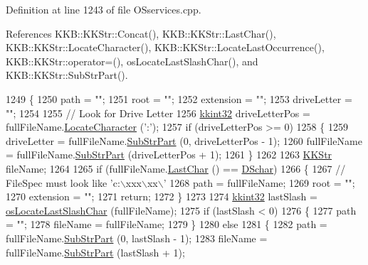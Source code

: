 Definition at line 1243 of file O\+Sservices.\+cpp.



References K\+K\+B\+::\+K\+K\+Str\+::\+Concat(), K\+K\+B\+::\+K\+K\+Str\+::\+Last\+Char(), K\+K\+B\+::\+K\+K\+Str\+::\+Locate\+Character(), K\+K\+B\+::\+K\+K\+Str\+::\+Locate\+Last\+Occurrence(), K\+K\+B\+::\+K\+K\+Str\+::operator=(), os\+Locate\+Last\+Slash\+Char(), and K\+K\+B\+::\+K\+K\+Str\+::\+Sub\+Str\+Part().


\begin{DoxyCode}
1249 \{
1250   path = \textcolor{stringliteral}{""};
1251   root = \textcolor{stringliteral}{""};
1252   extension = \textcolor{stringliteral}{""};
1253   driveLetter = \textcolor{stringliteral}{""};
1254 
1255   \textcolor{comment}{// Look for Drive Letter}
1256   \hyperlink{namespace_k_k_b_a8fa4952cc84fda1de4bec1fbdd8d5b1b}{kkint32}  driveLetterPos = fullFileName.\hyperlink{class_k_k_b_1_1_k_k_str_ad738b238e609887bbf27841f359046cd}{LocateCharacter} (\textcolor{charliteral}{':'});
1257   \textcolor{keywordflow}{if}  (driveLetterPos >= 0)
1258   \{
1259     driveLetter  = fullFileName.\hyperlink{class_k_k_b_1_1_k_k_str_a5f20b2ddfc9f07c8ef99592810332ddb}{SubStrPart} (0, driveLetterPos - 1);
1260     fullFileName = fullFileName.\hyperlink{class_k_k_b_1_1_k_k_str_a5f20b2ddfc9f07c8ef99592810332ddb}{SubStrPart} (driveLetterPos + 1);
1261   \}
1262 
1263   \hyperlink{class_k_k_b_1_1_k_k_str}{KKStr}  fileName;
1264 
1265   \textcolor{keywordflow}{if}  (fullFileName.\hyperlink{class_k_k_b_1_1_k_k_str_ad1951ace757c18c2d01df666b3a4032c}{LastChar} () == \hyperlink{_o_sservices_8h_a29059d292084a3fa6111cd5ea6cac1d9}{DSchar})
1266   \{
1267     \textcolor{comment}{// FileSpec must look like  'c:\(\backslash\)xxx\(\backslash\)xx\(\backslash\)'}
1268     path      = fullFileName;
1269     root      = \textcolor{stringliteral}{""};
1270     extension = \textcolor{stringliteral}{""};
1271     \textcolor{keywordflow}{return};
1272   \}
1273 
1274   \hyperlink{namespace_k_k_b_a8fa4952cc84fda1de4bec1fbdd8d5b1b}{kkint32}  lastSlash =  \hyperlink{namespace_k_k_b_ada3fe25ed5e0c30732f3cd6bd2a29edb}{osLocateLastSlashChar} (fullFileName);
1275   \textcolor{keywordflow}{if}  (lastSlash < 0)
1276   \{
1277     path = \textcolor{stringliteral}{""};
1278     fileName = fullFileName;
1279   \}
1280   \textcolor{keywordflow}{else} 
1281   \{
1282     path     = fullFileName.\hyperlink{class_k_k_b_1_1_k_k_str_a5f20b2ddfc9f07c8ef99592810332ddb}{SubStrPart} (0, lastSlash - 1);
1283     fileName = fullFileName.\hyperlink{class_k_k_b_1_1_k_k_str_a5f20b2ddfc9f07c8ef99592810332ddb}{SubStrPart} (lastSlash + 1);

\end{DoxyCode}
